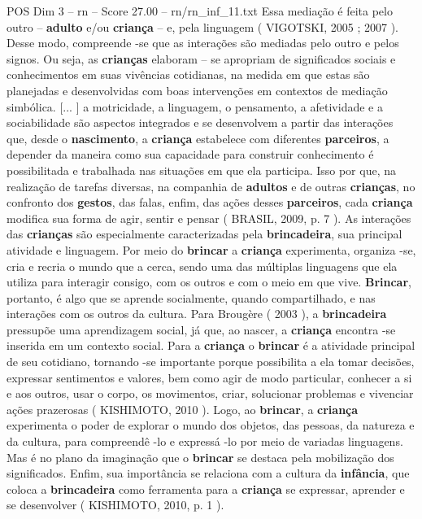 \begin{textsample}{POS Dim 3 – rn – Score 27.00 – rn/rn\_inf\_11.txt}
Essa mediação é feita pelo outro – \textbf{adulto} e/ou \textbf{criança} – e, pela linguagem ( VIGOTSKI, 2005 ; 2007 ).
Desse modo, compreende -se que as interações são mediadas pelo outro e pelos signos.
Ou seja, as \textbf{crianças} elaboram – se apropriam de significados sociais e conhecimentos em suas vivências cotidianas, na medida em que estas são planejadas e desenvolvidas com boas intervenções em contextos de mediação simbólica. [... ] a motricidade, a linguagem, o pensamento, a afetividade e a sociabilidade são aspectos integrados e se desenvolvem a partir das interações que, desde o \textbf{nascimento}, a \textbf{criança} estabelece com diferentes \textbf{parceiros}, a depender da maneira como sua capacidade para construir conhecimento é possibilitada e trabalhada nas situações em que ela participa.
Isso por que, na realização de tarefas diversas, na companhia de \textbf{adultos} e de outras \textbf{crianças}, no confronto dos \textbf{gestos}, das falas, enfim, das ações desses \textbf{parceiros}, cada \textbf{criança} modifica sua forma de agir, sentir e pensar ( BRASIL, 2009, p. 7 ).
As interações das \textbf{crianças} são especialmente caracterizadas pela \textbf{brincadeira}, sua principal atividade e linguagem.
Por meio do \textbf{brincar} a \textbf{criança} experimenta, organiza -se, cria e recria o mundo que a cerca, sendo uma das múltiplas linguagens que ela utiliza para interagir consigo, com os outros e com o meio em que vive. \textbf{Brincar}, portanto, é algo que se aprende socialmente, quando compartilhado, e nas interações com os outros da cultura.
Para Brougère ( 2003 ), a \textbf{brincadeira} pressupõe uma aprendizagem social, já que, ao nascer, a \textbf{criança} encontra -se inserida em um contexto social.
Para a \textbf{criança} o \textbf{brincar} é a atividade principal de seu cotidiano, tornando -se importante porque possibilita a ela tomar decisões, expressar sentimentos e valores, bem como agir de modo particular, conhecer a si e aos outros, usar o corpo, os movimentos, criar, solucionar problemas e vivenciar ações prazerosas ( KISHIMOTO, 2010 ).
Logo, ao \textbf{brincar}, a \textbf{criança} experimenta o poder de explorar o mundo dos objetos, das pessoas, da natureza e da cultura, para compreendê -lo e expressá -lo por meio de variadas linguagens.
Mas é no plano da imaginação que o \textbf{brincar} se destaca pela mobilização dos significados.
Enfim, sua importância se relaciona com a cultura da \textbf{infância}, que coloca a \textbf{brincadeira} como ferramenta para a \textbf{criança} se expressar, aprender e se desenvolver ( KISHIMOTO, 2010, p. 1 ).

\end{textsample}
